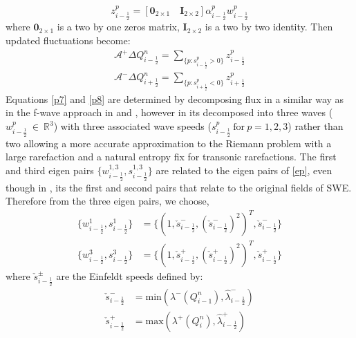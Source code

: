 \documentclass[10pt,a4paper]{article}
\begin{document}
	\begin{equation}
		z_{i-\frac{1}{2}}^{p} = [\mathbf{0}_{2\times1} \quad \mathbf{I}_{2\times2}] \alpha_{i-\frac{1}{2}}^{p} w_{i-\frac{1}{2}}^{p}
	\end{equation}
	where $\mathbf{0}_{2\times1}$ is a two by one zeros matrix, $\mathbf{I}_{2\times2}$ is a two by two identity. Then updated fluctuations become:
	\begin{eqnarray}
		\mathcal{A^{+}}\Delta Q_{i-\frac{1}{2}}^{n} = \sum_{\{ p:s_{i-\frac{1}{2}}^{p}>0\}}  z_{i-\frac{1}{2}}^{p}
		\label{p7}\\
		\mathcal{A^{-}}\Delta Q_{i+\frac{1}{2}}^{n} = \sum_{\{ p:s_{i+\frac{1}{2}}^{p}<0\}} z_{i+\frac{1}{2}}^{p}
		\label{p8}
	\end{eqnarray}
	Equations \ref{p7} and \ref{p8} are determined by decomposing flux in a similar way as in the f-wave approach in \citet{ba-le-mi-ro:2003} and \citet{george2006finite}, however in  \citet{ge:2008}  its decomposed into three waves ($w^{p}_{i-\frac{1}{2}} ~\in ~\mathbb{R}^{3}$)  with three associated wave speeds ($s^{p}_{i-\frac{1}{2}} ~\text{for}~ p =1,2,3$)  rather than two  allowing a more accurate approximation to the Riemann problem with a large rarefaction and a natural entropy fix for transonic rarefactions. The first and third eigen pairs $\{w^{1,3}_{i-\frac{1}{2}},s^{1,3}_{i-\frac{1}{2}}\}  $    are related to the eigen pairs of \eqref{ep}, even though in  \citet{be-ge-le-ma:2011}, its the first and second pairs that relate to the original fields of SWE. Therefore from the three eigen pairs, we choose, 
	\begin{equation}
		\begin{aligned}
			\{w^{1}_{i-\frac{1}{2}},s^{1}_{i-\frac{1}{2}}\} &= \{(1,\check{s}_{i-\frac{1}{2}}^{-} ,(\check{s}_{i-\frac{1}{2}}^{-} )^{2})^{T},\check{s}_{i-\frac{1}{2}}^{-} \} \\
			\{w^{3}_{i-\frac{1}{2}},s^{3}_{i-\frac{1}{2}}\} &= \{(1,\check{s}_{i-\frac{1}{2}}^{+} ,(\check{s}_{i-\frac{1}{2}}^{+} )^{2})^{T},\check{s}_{i-\frac{1}{2}}^{+} \} 
		\end{aligned}
	\end{equation}
	where $\check{s}_{i-\frac{1}{2}}^{\pm}$ are the Einfeldt speeds \cite{barzgaran2019numerical,ge:2008,be-ge-le-ma:2011} defined by:
	\begin{equation}
		\begin{aligned}
			\check{s}_{i-\frac{1}{2}}^{-} &= \text{min}(\lambda^{-}(Q^n_{i-1}),\hat{\lambda}_{i-\frac{1}{2}}^{-}) \\
			\check{s}_{i-\frac{1}{2}}^{+} &= \text{max}(\lambda^{+}(Q^n_{i}),\hat{\lambda}_{i-\frac{1}{2}}^{+})
		\end{aligned}
		\label{EE}
	\end{equation}
\end{document}
